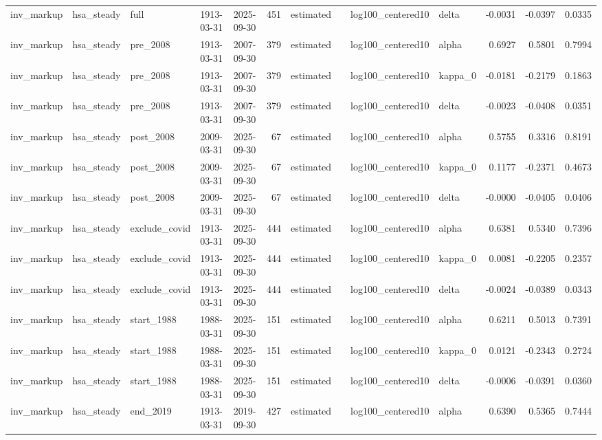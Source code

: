 \begin{tabular}{lllllrllllrrr}
inv\_markup & hsa\_steady & full & 1913-03-31 & 2025-09-30 & 451 & estimated &  & log100\_centered10 & delta & -0.0031 & -0.0397 & 0.0335 \\
inv\_markup & hsa\_steady & pre\_2008 & 1913-03-31 & 2007-09-30 & 379 & estimated &  & log100\_centered10 & alpha & 0.6927 & 0.5801 & 0.7994 \\
inv\_markup & hsa\_steady & pre\_2008 & 1913-03-31 & 2007-09-30 & 379 & estimated &  & log100\_centered10 & kappa\_0 & -0.0181 & -0.2179 & 0.1863 \\
inv\_markup & hsa\_steady & pre\_2008 & 1913-03-31 & 2007-09-30 & 379 & estimated &  & log100\_centered10 & delta & -0.0023 & -0.0408 & 0.0351 \\
inv\_markup & hsa\_steady & post\_2008 & 2009-03-31 & 2025-09-30 & 67 & estimated &  & log100\_centered10 & alpha & 0.5755 & 0.3316 & 0.8191 \\
inv\_markup & hsa\_steady & post\_2008 & 2009-03-31 & 2025-09-30 & 67 & estimated &  & log100\_centered10 & kappa\_0 & 0.1177 & -0.2371 & 0.4673 \\
inv\_markup & hsa\_steady & post\_2008 & 2009-03-31 & 2025-09-30 & 67 & estimated &  & log100\_centered10 & delta & -0.0000 & -0.0405 & 0.0406 \\
inv\_markup & hsa\_steady & exclude\_covid & 1913-03-31 & 2025-09-30 & 444 & estimated &  & log100\_centered10 & alpha & 0.6381 & 0.5340 & 0.7396 \\
inv\_markup & hsa\_steady & exclude\_covid & 1913-03-31 & 2025-09-30 & 444 & estimated &  & log100\_centered10 & kappa\_0 & 0.0081 & -0.2205 & 0.2357 \\
inv\_markup & hsa\_steady & exclude\_covid & 1913-03-31 & 2025-09-30 & 444 & estimated &  & log100\_centered10 & delta & -0.0024 & -0.0389 & 0.0343 \\
inv\_markup & hsa\_steady & start\_1988 & 1988-03-31 & 2025-09-30 & 151 & estimated &  & log100\_centered10 & alpha & 0.6211 & 0.5013 & 0.7391 \\
inv\_markup & hsa\_steady & start\_1988 & 1988-03-31 & 2025-09-30 & 151 & estimated &  & log100\_centered10 & kappa\_0 & 0.0121 & -0.2343 & 0.2724 \\
inv\_markup & hsa\_steady & start\_1988 & 1988-03-31 & 2025-09-30 & 151 & estimated &  & log100\_centered10 & delta & -0.0006 & -0.0391 & 0.0360 \\
inv\_markup & hsa\_steady & end\_2019 & 1913-03-31 & 2019-09-30 & 427 & estimated &  & log100\_centered10 & alpha & 0.6390 & 0.5365 & 0.7444 \\

\end{tabular}
